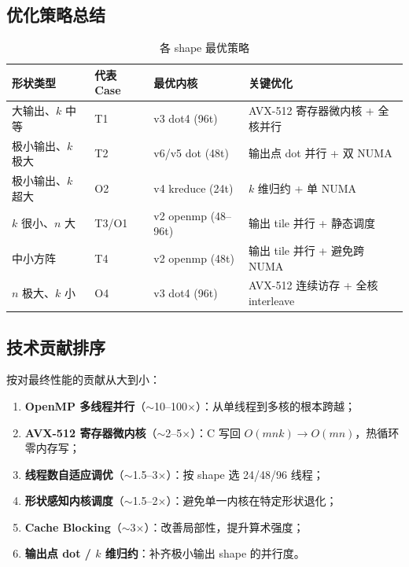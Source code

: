 \documentclass[11pt,a4paper,fontset=fandol]{ctexart}
\begin{document}
\subsection{优化策略总结}
\begin{table}[H]
\centering
\caption{各 shape 最优策略}
\small
\begin{tabular}{llll}
\toprule
形状类型 & 代表 Case & 最优内核 & 关键优化 \\
\midrule
大输出、$k$ 中等 & T1 & v3 dot4 (96t) & AVX-512 寄存器微内核 + 全核并行 \\
极小输出、$k$ 极大 & T2 & v6/v5 dot (48t) & 输出点 dot 并行 + 双 NUMA \\
极小输出、$k$ 超大 & O2 & v4 kreduce (24t) & $k$ 维归约 + 单 NUMA \\
$k$ 很小、$n$ 大 & T3/O1 & v2 openmp (48--96t) & 输出 tile 并行 + 静态调度 \\
中小方阵 & T4 & v2 openmp (48t) & 输出 tile 并行 + 避免跨 NUMA \\
$n$ 极大、$k$ 小 & O4 & v3 dot4 (96t) & AVX-512 连续访存 + 全核 interleave \\
\bottomrule
\end{tabular}
\end{table}

\subsection{技术贡献排序}
按对最终性能的贡献从大到小：
\begin{enumerate}[leftmargin=2.4em]
  \item \textbf{OpenMP 多线程并行}（$\sim$10--100$\times$）：从单线程到多核的根本跨越；
  \item \textbf{AVX-512 寄存器微内核}（$\sim$2--5$\times$）：C 写回 $O(mnk)\to O(mn)$，热循环零内存写；
  \item \textbf{线程数自适应调优}（$\sim$1.5--3$\times$）：按 shape 选 24/48/96 线程；
  \item \textbf{形状感知内核调度}（$\sim$1.5--2$\times$）：避免单一内核在特定形状退化；
  \item \textbf{Cache Blocking}（$\sim$3$\times$）：改善局部性，提升算术强度；
  \item \textbf{输出点 dot / $k$ 维归约}：补齐极小输出 shape 的并行度。
\end{enumerate}
\end{document}
